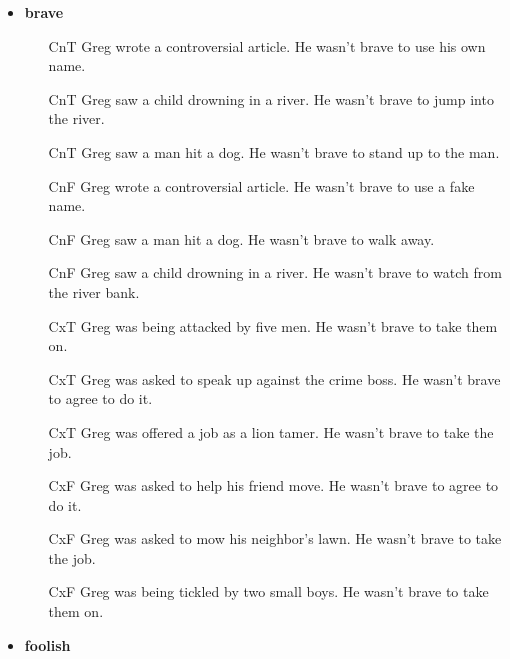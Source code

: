\documentclass[11pt,fleqn]{article}
\newcommand{\6}{\mbox{$[\hspace*{-.6mm}[$}}
\newcommand{\9}{\mbox{$]\hspace*{-.6mm}]$}}
\begin{document}
\begin{itemize}[leftmargin=15pt,itemsep=-1pt]

\item {\bf brave}

\begin{enumerate}[leftmargin=15pt,topsep=0pt,itemsep=0pt]

\item[CnT] 	Greg wrote a controversial article.	He	wasn't brave	to use his own name.
\item[CnT] 	Greg saw a child drowning in a river.	He	wasn't brave	to jump into the river.
\item[CnT] 	Greg saw a man hit a dog.	He	wasn't brave	to stand up to the man.
\item[CnF] 	Greg wrote a controversial article.	He	wasn't brave	to use a fake name.
\item[CnF] 	Greg saw a man hit a dog.	He	wasn't brave	to walk away.
\item[CnF] 	Greg saw a child drowning in a river.	He	wasn't brave	to watch from the river bank.
\item[CxT] 	Greg was being attacked by five men.	He	wasn't brave	to take them on.
\item[CxT] 	Greg was asked to speak up against the crime boss.	He	wasn't brave	to agree to do it.
\item[CxT] 	Greg was offered a job as a lion tamer.	He	wasn't brave	to take the job.
\item[CxF] 	Greg was asked to help his friend move.	He	wasn't brave	to agree to do it.
\item[CxF] 	Greg was asked to mow his neighbor's lawn.	He	wasn't brave	to take the job.
\item[CxF] 	Greg was being tickled by two small boys.	He	wasn't brave	to take them on.

\end{enumerate}

\item {\bf foolish}

\begin{enumerate}[leftmargin=15pt,topsep=0pt,itemsep=0pt]



\end{enumerate}
\end{itemize}
\end{document}
